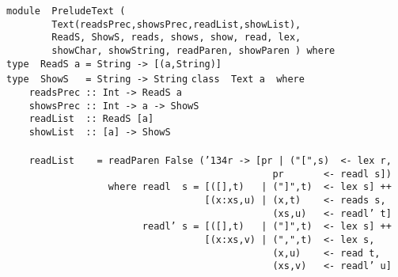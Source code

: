 \noindent\bprogB
\mbox{\tt module\ \ PreludeText\ (}\\
\mbox{\tt \ \ \ \ \ \ \ \ Text(readsPrec,showsPrec,readList,showList),}\\
\mbox{\tt \ \ \ \ \ \ \ \ ReadS,\ ShowS,\ reads,\ shows,\ show,\ read,\ lex,}\\
\mbox{\tt \ \ \ \ \ \ \ \ showChar,\ showString,\ readParen,\ showParen\ )\ where}
%
\eprogB\noindent\bprogB
\mbox{\tt type\ \ ReadS\ a\ =\ String\ ->\ [(a,String)]}\\
\mbox{\tt type\ \ ShowS\ \ \ =\ String\ ->\ String}
%
%
\eprogB\noindent\bprogB
\mbox{\tt class\ \ Text\ a\ \ where}\\
\mbox{\tt \ \ \ \ readsPrec\ ::\ Int\ ->\ ReadS\ a}\\
\mbox{\tt \ \ \ \ showsPrec\ ::\ Int\ ->\ a\ ->\ ShowS}\\
\mbox{\tt \ \ \ \ readList\ \ ::\ ReadS\ [a]}\\
\mbox{\tt \ \ \ \ showList\ \ ::\ [a]\ ->\ ShowS}\\
\mbox{\tt }\\[-8pt]
\mbox{\tt \ \ \ \ readList\ \ \ \ =\ readParen\ False\ ({\char'134}r\ ->\ [pr\ |\ ("[",s)\ \ <-\ lex\ r,}\\
\mbox{\tt \ \ \ \ \ \ \ \ \ \ \ \ \ \ \ \ \ \ \ \ \ \ \ \ \ \ \ \ \ \ \ \ \ \ \ \ \ \ \ \ \ \ \ \ \ \ \ pr\ \ \ \ \ \ \ <-\ readl\ s])}\\
\mbox{\tt \ \ \ \ \ \ \ \ \ \ \ \ \ \ \ \ \ \ where\ readl\ \ s\ =\ [([],t)\ \ \ |\ ("]",t)\ \ <-\ lex\ s]\ ++}\\
\mbox{\tt \ \ \ \ \ \ \ \ \ \ \ \ \ \ \ \ \ \ \ \ \ \ \ \ \ \ \ \ \ \ \ \ \ \ \ [(x:xs,u)\ |\ (x,t)\ \ \ \ <-\ reads\ s,}\\
\mbox{\tt \ \ \ \ \ \ \ \ \ \ \ \ \ \ \ \ \ \ \ \ \ \ \ \ \ \ \ \ \ \ \ \ \ \ \ \ \ \ \ \ \ \ \ \ \ \ \ (xs,u)\ \ \ <-\ readl'\ t]}\\
\mbox{\tt \ \ \ \ \ \ \ \ \ \ \ \ \ \ \ \ \ \ \ \ \ \ \ \ readl'\ s\ =\ [([],t)\ \ \ |\ ("]",t)\ \ <-\ lex\ s]\ ++}\\
\mbox{\tt \ \ \ \ \ \ \ \ \ \ \ \ \ \ \ \ \ \ \ \ \ \ \ \ \ \ \ \ \ \ \ \ \ \ \ [(x:xs,v)\ |\ (",",t)\ \ <-\ lex\ s,}\\
\mbox{\tt \ \ \ \ \ \ \ \ \ \ \ \ \ \ \ \ \ \ \ \ \ \ \ \ \ \ \ \ \ \ \ \ \ \ \ \ \ \ \ \ \ \ \ \ \ \ \ (x,u)\ \ \ \ <-\ read\ t,}\\
\mbox{\tt \ \ \ \ \ \ \ \ \ \ \ \ \ \ \ \ \ \ \ \ \ \ \ \ \ \ \ \ \ \ \ \ \ \ \ \ \ \ \ \ \ \ \ \ \ \ \ (xs,v)\ \ \ <-\ readl'\ u]}\\
